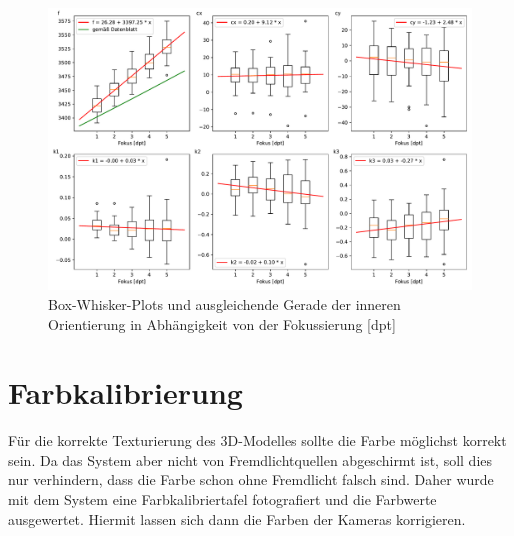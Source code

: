 \documentclass[./00PhotoBox.tex]{subfiles}
\begin{document}
\begin{figure}
    \centering
    \includegraphics[width=1\textwidth]{./img/naeherungswerte_diagramm.pdf}
    \caption{Box-Whisker-Plots und ausgleichende Gerade der inneren Orientierung in Abhängigkeit von der Fokussierung [dpt]} %
    \label{img:naeherungswerte} %
\end{figure}



\section{Farbkalibrierung}

Für die korrekte Texturierung des 3D-Modelles sollte die Farbe möglichst korrekt sein. Da das System aber nicht von Fremdlichtquellen abgeschirmt ist, soll dies nur verhindern, dass die Farbe schon ohne Fremdlicht falsch sind. Daher wurde mit dem System eine Farbkalibriertafel fotografiert und die Farbwerte ausgewertet. Hiermit lassen sich dann die Farben der Kameras korrigieren. \citep[S. 431f]{luhmann}


\biblio
\end{document}
